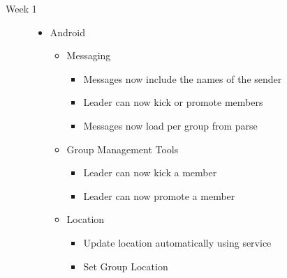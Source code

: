 \documentclass[11pt]{article}
\begin{document}
\begin{description}
	\item[Week 1] \hfill
	\begin{itemize}
		\item Android
		\begin{itemize}
			\item Messaging
			\begin{itemize}
				\item Messages now include the names of the sender
				\item Leader can now kick or promote members
				\item Messages now load per group from parse
			\end{itemize}
			\item Group Management Tools
			\begin{itemize}
				\item Leader can now kick a member
				\item Leader can now promote a member
			\end{itemize}
			\item Location
			\begin{itemize}
				\item Update location automatically using service
				\item Set Group Location
			\end{itemize}
		\end{itemize}
	\end{itemize}
	

\end{description}
\end{document}
